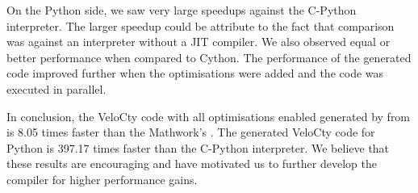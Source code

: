 On the Python side, we saw very large speedups against the C-Python interpreter. The larger speedup could be attribute to the fact that comparison was against an interpreter without a JIT compiler. We also observed equal or better performance when compared to Cython. The performance of the generated code improved further when the optimisations were added and the code was executed in parallel. 

In conclusion, the VeloCty code with all optimisations enabled generated by \velocty from \matlab is 8.05 times faster than the Mathwork's \matlab. The generated VeloCty code for Python is 397.17 times faster than the C-Python interpreter. We believe that these results are encouraging and have motivated us to further develop the compiler for higher performance gains. 
